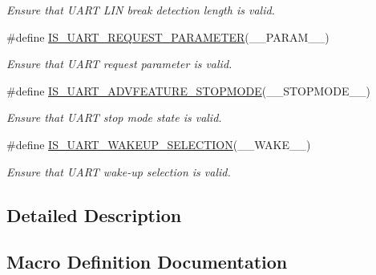 \begin{DoxyCompactItemize}
\begin{DoxyCompactList}\small\item\em Ensure that U\+A\+RT L\+IN break detection length is valid. \end{DoxyCompactList}\item 
\#define \hyperlink{group___u_a_r_t_ex___private___macros_ga5cf62c9c598753525888cc7c24be3cb2}{I\+S\+\_\+\+U\+A\+R\+T\+\_\+\+R\+E\+Q\+U\+E\+S\+T\+\_\+\+P\+A\+R\+A\+M\+E\+T\+ER}(\+\_\+\+\_\+\+P\+A\+R\+A\+M\+\_\+\+\_\+)
\begin{DoxyCompactList}\small\item\em Ensure that U\+A\+RT request parameter is valid. \end{DoxyCompactList}\item 
\#define \hyperlink{group___u_a_r_t_ex___private___macros_gae0055233b6372a290fe69c811d307c5e}{I\+S\+\_\+\+U\+A\+R\+T\+\_\+\+A\+D\+V\+F\+E\+A\+T\+U\+R\+E\+\_\+\+S\+T\+O\+P\+M\+O\+DE}(\+\_\+\+\_\+\+S\+T\+O\+P\+M\+O\+D\+E\+\_\+\+\_\+)
\begin{DoxyCompactList}\small\item\em Ensure that U\+A\+RT stop mode state is valid. \end{DoxyCompactList}\item 
\#define \hyperlink{group___u_a_r_t_ex___private___macros_gaab6d7b59cffaf070ac3db100c76f4654}{I\+S\+\_\+\+U\+A\+R\+T\+\_\+\+W\+A\+K\+E\+U\+P\+\_\+\+S\+E\+L\+E\+C\+T\+I\+ON}(\+\_\+\+\_\+\+W\+A\+K\+E\+\_\+\+\_\+)
\begin{DoxyCompactList}\small\item\em Ensure that U\+A\+RT wake-\/up selection is valid. \end{DoxyCompactList}\end{DoxyCompactItemize}


\subsection{Detailed Description}


\subsection{Macro Definition Documentation}
\mbox{\label{group___u_a_r_t_ex___private___macros_ga88f07bdfe1fcdff17edbbba2f196110d}} 
